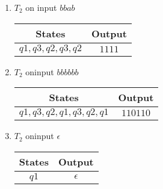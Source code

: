 \begin{enumerate}
\begin{enumerate}
\begin{table}[H]
                    \end{table}
              \item $T_2$ on input $bbab$
                    \begin{table}[H]
                        \centering
                        \begin{tabular}{|c|c|}
                            \hline
                            States           & Output \\
                            \hline
                            $q1,q3,q2,q3,q2$ & $1111$ \\
                            \hline
                        \end{tabular}
                    \end{table}
              \item $T_2$ oninput $bbbbbb$
                    \begin{table}[H]
                        \centering
                        \begin{tabular}{|c|c|}
                            \hline
                            States                 & Output   \\
                            \hline
                            $q1,q3,q2,q1,q3,q2,q1$ & $110110$ \\
                            \hline
                        \end{tabular}
                    \end{table}
              \item $T_2$ oninput $\epsilon$
                    \begin{table}[H]
                        \centering
                        \begin{tabular}{|c|c|}
                            \hline
                            States & Output     \\
                            \hline
                            $q1$   & $\epsilon$ \\
                            \hline
                        \end{tabular}
                    \end{table}
          \end{enumerate}
\end{enumerate}
